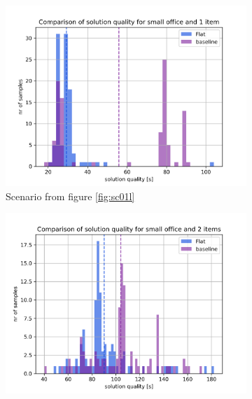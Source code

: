 \begin{figure}
    \centering
    \begin{subfigure}[b]{0.49\textwidth}
        \includegraphics[width=\textwidth]{Report/images/sol_quality/envsmall_sc01_solqual_hist.png}
        \caption{Scenario from figure \ref{fig:sc01l}}
        \label{subfig:b1vsFlat_sc01}
    \end{subfigure}
    \begin{subfigure}[b]{0.49\textwidth}
         \includegraphics[width=\textwidth]{Report/images/sol_quality/envsmall_sc04_solqual_hist.png}

\end{subfigure}
\end{figure}
